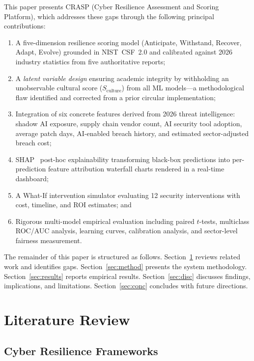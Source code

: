 \documentclass[journal]{IEEEtran}
\begin{document}
This paper presents CRASP (Cyber Resilience Assessment and Scoring Platform),
which addresses these gaps through the following principal contributions:
\begin{enumerate}
  \item A five-dimension resilience scoring model (Anticipate, Withstand,
        Recover, Adapt, Evolve) grounded in NIST~CSF~2.0 and calibrated
        against 2026 industry statistics from five authoritative reports;
  \item A \emph{latent variable design} ensuring academic integrity by
        withholding an unobservable cultural score ($S_\text{culture}$) from
        all ML models---a methodological flaw identified and corrected from
        a prior circular implementation;
  \item Integration of six concrete features derived from 2026 threat
        intelligence: shadow AI exposure, supply chain vendor count, AI
        security tool adoption, average patch days, AI-enabled breach history,
        and estimated sector-adjusted breach cost;
  \item SHAP~\cite{lundberg2017shap} post-hoc explainability transforming
        black-box predictions into per-prediction feature attribution waterfall
        charts rendered in a real-time dashboard;
  \item A What-If intervention simulator evaluating 12 security interventions
        with cost, timeline, and ROI estimates; and
  \item Rigorous multi-model empirical evaluation including paired $t$-tests,
        multiclass ROC/AUC analysis, learning curves, calibration analysis,
        and sector-level fairness measurement.
\end{enumerate}

The remainder of this paper is structured as follows. Section~\ref{sec:related}
reviews related work and identifies gaps. Section~\ref{sec:method} presents
the system methodology. Section~\ref{sec:results} reports empirical results.
Section~\ref{sec:disc} discusses findings, implications, and limitations.
Section~\ref{sec:conc} concludes with future directions.


\section{Literature Review}
\label{sec:related}

\subsection{Cyber Resilience Frameworks}
\end{document}
